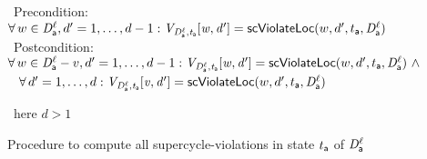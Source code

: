 \begin{figure}[ht]
\begin{tabbing}
\cmnt\ Precondition: $\forall\, w \in \mathit{D}_{\mathsf{a}}^{\ell}, d' = 1,\ldots,d-1: \mathit{V_{\mathit{D}_{\mathsf{a}}^{\ell},t_{\mathsf{a}}} [w,d']} = \mathsf{scViolateLoc}(w,d',t_{\mathsf{a}},\mathit{D}_{\mathsf{a}}^{\ell})$\\
\cmnt\ Postcondition: $\forall\, w \in \mathit{D}_{\mathsf{a}}^{\ell}-v, d' = 1,\ldots,d-1:  \mathit{V_{\mathit{D}_{\mathsf{a}}^{\ell},t_{\mathsf{a}}} [w,d']} = \mathsf{scViolateLoc}(w,d',t_{\mathsf{a}},\mathit{D}_{\mathsf{a}}^{\ell}) ~\land$ \\
\cmnt\ \hspace{6.5em} $\forall\, d' = 1,\ldots,d:  \mathit{V_{\mathit{D}_{\mathsf{a}}^{\ell},t_{\mathsf{a}}} [v,d']} = \mathsf{scViolateLoc}(w,d',t_{\mathsf{a}},\mathit{D}_{\mathsf{a}}^{\ell})$ \\

       \lit{\FI}
\lio{\FI}


\cmnt\ here $d > 1$\\




\lio{\FI}
\end{tabbing}
\vspace{-3ex}

\caption{Procedure to compute all supercycle-violations in state $t_{\mathsf{a}}$ of $\mathit{D}_{\mathsf{a}}^{\ell}$}
\label{fig:computeSCViolateLocDSK}
\label{fig:computeSCViolateLoc}
\end{figure}





















